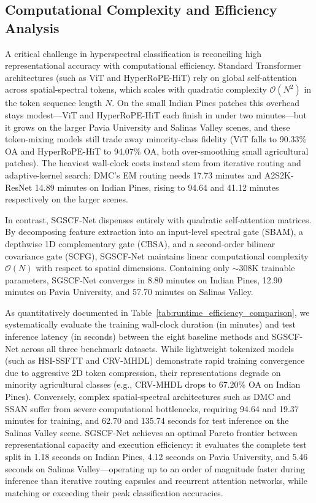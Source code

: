\documentclass[manuscript,screen,review]{acmart}
\begin{document}
\subsection{Computational Complexity and Efficiency Analysis}
\label{subsec:complexity_analysis}
A critical challenge in hyperspectral classification is reconciling high representational accuracy with computational efficiency. Standard Transformer architectures (such as ViT and HyperRoPE-HiT) rely on global self-attention across spatial-spectral tokens, which scales with quadratic complexity $\mathcal{O}(N^2)$ in the token sequence length $N$. On the small Indian Pines patches this overhead stays modest---ViT and HyperRoPE-HiT each finish in under two minutes---but it grows on the larger Pavia University and Salinas Valley scenes, and these token-mixing models still trade away minority-class fidelity (ViT falls to 90.33\% OA and HyperRoPE-HiT to 94.07\% OA, both over-smoothing small agricultural patches). The heaviest wall-clock costs instead stem from iterative routing and adaptive-kernel search: DMC's EM routing needs 17.73 minutes and A2S2K-ResNet 14.89 minutes on Indian Pines, rising to 94.64 and 41.12 minutes respectively on the larger scenes.

In contrast, SGSCF-Net dispenses entirely with quadratic self-attention matrices. By decomposing feature extraction into an input-level spectral gate (SBAM), a depthwise 1D complementary gate (CBSA), and a second-order bilinear covariance gate (SCFG), SGSCF-Net maintains linear computational complexity $\mathcal{O}(N)$ with respect to spatial dimensions. Containing only $\sim$308K trainable parameters, SGSCF-Net converges in 8.80 minutes on Indian Pines, 12.90 minutes on Pavia University, and 57.70 minutes on Salinas Valley.

As quantitatively documented in Table~\ref{tab:runtime_efficiency_comparison}, we systematically evaluate the training wall-clock duration (in minutes) and test inference latency (in seconds) between the eight baseline methods and SGSCF-Net across all three benchmark datasets. While lightweight tokenized models (such as HSI-SSFTT and CRV-MHDL) demonstrate rapid training convergence due to aggressive 2D token compression, their representations degrade on minority agricultural classes (e.g., CRV-MHDL drops to 67.20\% OA on Indian Pines). Conversely, complex spatial-spectral architectures such as DMC and SSAN suffer from severe computational bottlenecks, requiring 94.64 and 19.37 minutes for training, and 62.70 and 135.74 seconds for test inference on the Salinas Valley scene. SGSCF-Net achieves an optimal Pareto frontier between representational capacity and execution efficiency: it evaluates the complete test split in 1.18 seconds on Indian Pines, 4.12 seconds on Pavia University, and 5.46 seconds on Salinas Valley---operating up to an order of magnitude faster during inference than iterative routing capsules and recurrent attention networks, while matching or exceeding their peak classification accuracies.
\end{document}
